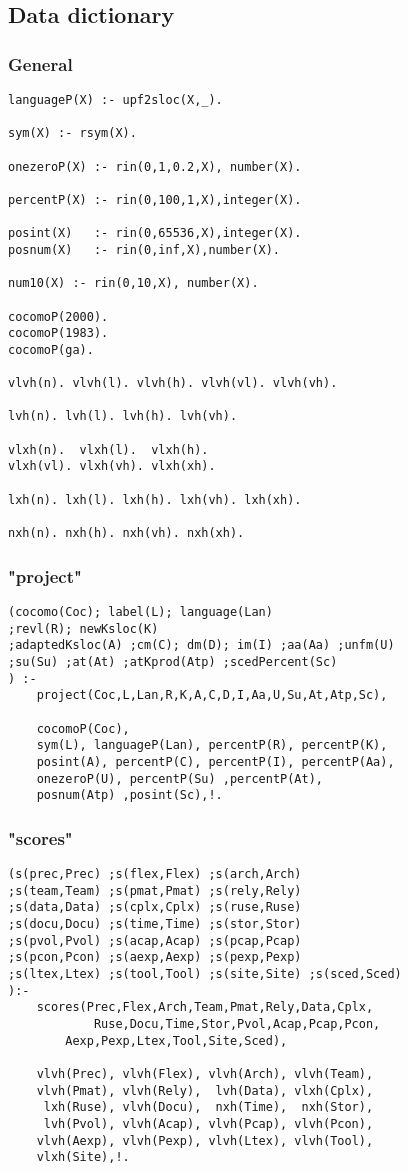 \subsection{ Data dictionary
}
\subsubsection{ General }\begin{Verbatim}
languageP(X) :- upf2sloc(X,_).

sym(X) :- rsym(X).

onezeroP(X) :- rin(0,1,0.2,X), number(X).

percentP(X) :- rin(0,100,1,X),integer(X).

posint(X)   :- rin(0,65536,X),integer(X).
posnum(X)   :- rin(0,inf,X),number(X).

num10(X) :- rin(0,10,X), number(X).

cocomoP(2000).
cocomoP(1983).
cocomoP(ga).

vlvh(n). vlvh(l). vlvh(h). vlvh(vl). vlvh(vh).

lvh(n). lvh(l). lvh(h). lvh(vh).

vlxh(n).  vlxh(l).  vlxh(h).
vlxh(vl). vlxh(vh). vlxh(xh). 

lxh(n). lxh(l). lxh(h). lxh(vh). lxh(xh). 

nxh(n). nxh(h). nxh(vh). nxh(xh).
\end{Verbatim}
\subsubsection{ "project"
}
\begin{Verbatim}
(cocomo(Coc); label(L); language(Lan)
;revl(R); newKsloc(K)
;adaptedKsloc(A) ;cm(C); dm(D); im(I) ;aa(Aa) ;unfm(U)
;su(Su) ;at(At) ;atKprod(Atp) ;scedPercent(Sc)
) :-
	project(Coc,L,Lan,R,K,A,C,D,I,Aa,U,Su,At,Atp,Sc), 

	cocomoP(Coc),
	sym(L), languageP(Lan), percentP(R), percentP(K),
	posint(A), percentP(C), percentP(I), percentP(Aa),
	onezeroP(U), percentP(Su) ,percentP(At),
	posnum(Atp) ,posint(Sc),!.
\end{Verbatim}
\subsubsection{ "scores"
}
\begin{Verbatim}
(s(prec,Prec) ;s(flex,Flex) ;s(arch,Arch)
;s(team,Team) ;s(pmat,Pmat) ;s(rely,Rely)
;s(data,Data) ;s(cplx,Cplx) ;s(ruse,Ruse)
;s(docu,Docu) ;s(time,Time) ;s(stor,Stor)
;s(pvol,Pvol) ;s(acap,Acap) ;s(pcap,Pcap)
;s(pcon,Pcon) ;s(aexp,Aexp) ;s(pexp,Pexp)
;s(ltex,Ltex) ;s(tool,Tool) ;s(site,Site) ;s(sced,Sced)
):-
	scores(Prec,Flex,Arch,Team,Pmat,Rely,Data,Cplx,
	        Ruse,Docu,Time,Stor,Pvol,Acap,Pcap,Pcon,
		Aexp,Pexp,Ltex,Tool,Site,Sced),
		
	vlvh(Prec), vlvh(Flex), vlvh(Arch), vlvh(Team),
	vlvh(Pmat), vlvh(Rely),  lvh(Data), vlxh(Cplx),
	 lxh(Ruse), vlvh(Docu),  nxh(Time),  nxh(Stor),
	 lvh(Pvol), vlvh(Acap), vlvh(Pcap), vlvh(Pcon),
	vlvh(Aexp), vlvh(Pexp), vlvh(Ltex), vlvh(Tool),
	vlxh(Site),!.
\end{Verbatim}
